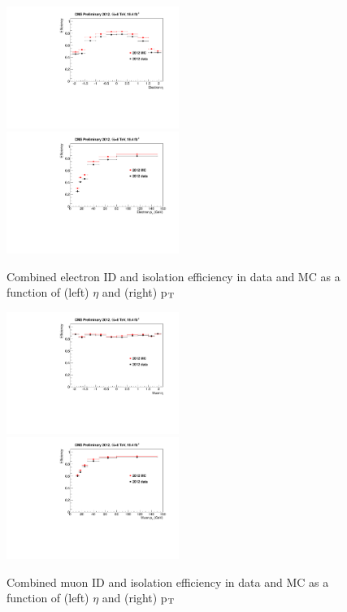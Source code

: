 \begin{figure}[h!]
\includegraphics[width=0.5\textwidth]{plots/TagAndProbe/ElectronIdIsoEta2012DatavsMC.pdf}
\includegraphics[width=0.5\textwidth]{plots/TagAndProbe/ElectronIdIsoPT2012DatavsMC.pdf}
\caption{Combined electron ID and isolation efficiency in data and MC as a
function of (left) $\eta$ and (right) p$_{\rm{T}}$}
\label{fig:electronIdIso}
\end{figure}

\begin{figure}[h!]
\includegraphics[width=0.5\textwidth]{plots/TagAndProbe/MuonIdIsoEta2012DatavsMC.pdf}
\includegraphics[width=0.5\textwidth]{plots/TagAndProbe/MuonIdIsoPT2012DatavsMC.pdf}
\caption{Combined muon ID and isolation efficiency in data and MC as a function
of (left) $\eta$ and (right) p$_{\rm{T}}$}
\label{fig:muonIdIso}
\end{figure}

